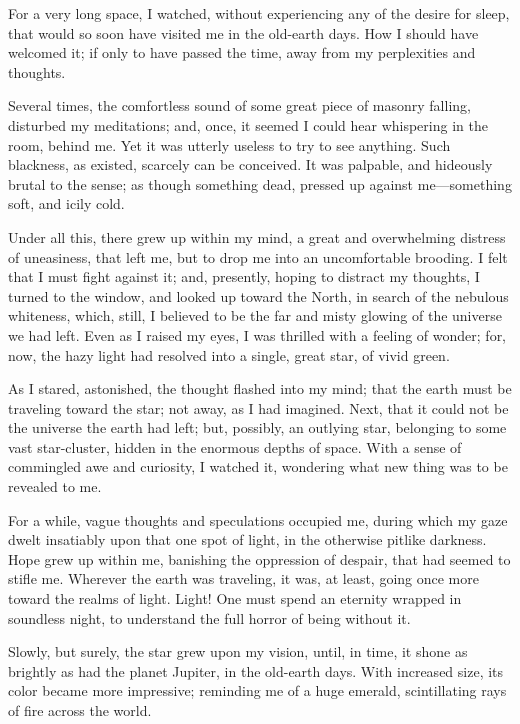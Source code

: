 For a very long space, I watched, without experiencing any of the desire for sleep, that would so soon have visited me in the old-earth days. How I should have welcomed it; if only to have passed the time, away from my perplexities and thoughts.

Several times, the comfortless sound of some great piece of masonry falling, disturbed my meditations; and, once, it seemed I could hear whispering in the room, behind me. Yet it was utterly useless to try to see anything. Such blackness, as existed, scarcely can be conceived. It was palpable, and hideously brutal to the sense; as though something dead, pressed up against me---something soft, and icily cold.

Under all this, there grew up within my mind, a great and overwhelming distress of uneasiness, that left me, but to drop me into an uncomfortable brooding. I felt that I must fight against it; and, presently, hoping to distract my thoughts, I turned to the window, and looked up toward the North, in search of the nebulous whiteness, which, still, I believed to be the far and misty glowing of the universe we had left. Even as I raised my eyes, I was thrilled with a feeling of wonder; for, now, the hazy light had resolved into a single, great star, of vivid green.

As I stared, astonished, the thought flashed into my mind; that the earth must be traveling toward the star; not away, as I had imagined. Next, that it could not be the universe the earth had left; but, possibly, an outlying star, belonging to some vast star-cluster, hidden in the enormous depths of space. With a sense of commingled awe and curiosity, I watched it, wondering what new thing was to be revealed to me.

For a while, vague thoughts and speculations occupied me, during which my gaze dwelt insatiably upon that one spot of light, in the otherwise pitlike darkness. Hope grew up within me, banishing the oppression of despair, that had seemed to stifle me. Wherever the earth was traveling, it was, at least, going once more toward the realms of light. Light! One must spend an eternity wrapped in soundless night, to understand the full horror of being without it.

Slowly, but surely, the star grew upon my vision, until, in time, it shone as brightly as had the planet Jupiter, in the old-earth days. With increased size, its color became more impressive; reminding me of a huge emerald, scintillating rays of fire across the world.

